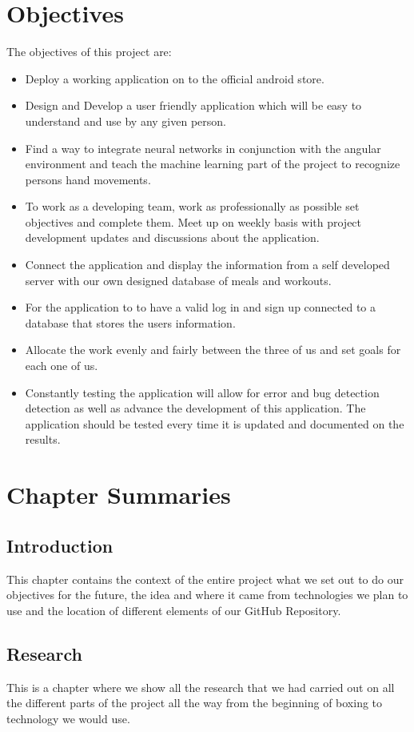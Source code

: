 \documentclass[a4paper,12pt]{report}
\begin{document}
\section{Objectives}
The objectives of this project are:
\begin{itemize}

\item Deploy a working application on to the official android store.
\item Design and Develop a user friendly application which will be easy to understand and use by any given person.
\item Find a way to integrate neural networks in conjunction with the angular environment and teach the machine learning part of the project to recognize persons hand movements.
\item To work as a developing team, work as professionally as possible set objectives and complete them. Meet up on weekly basis with project development updates and discussions about the application. 
\item Connect the application and display the information from a self developed server with our own designed database of meals and workouts.
\item For the application to to have a valid log in and sign up connected to a database that stores the users information.
\item Allocate the work evenly and fairly between the three of us and set goals for each one of us.
\item Constantly testing the application will allow for error and bug detection detection as well as advance the development of this application. The application should be tested every time it is updated and documented on the results.  
\end{itemize}

\section{Chapter Summaries}
\subsection{Introduction}
This chapter contains the context of the entire project what we set out to do our objectives for the future, the idea and where it came from technologies we plan to use and the location of different elements of our GitHub Repository. 

\subsection{Research}
This is a chapter where we show all the research that we had carried out on all the different parts of the project all the way from the beginning of boxing to technology we would use.
\end{document}
